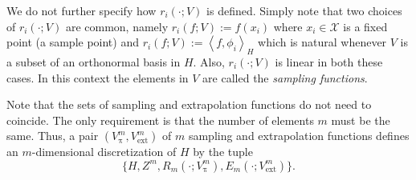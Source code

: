 \documentclass[a4paper]{paper}
\newcommand{\VecSpace}[1]{\mathscr{#1}}
\DeclareMathOperator{\rest}{\pi}
\newcommand{\ip}[2]{\left \langle #1,#2 \right\rangle}
\newcommand{\ext}{\text{ext}}
\begin{document}
We do not further specify how $r_{i}(\cdot;V)$ is defined.
    Simply note that two choices of $r_{i}(\cdot;V)$ are common, namely
    $r_{i}(f;V):=f(x_{i})$ where $x_{i}\in \VecSpace{X}$ is a fixed point (a sample 
    point) and $r_{i}(f;V):=\ip{f}{\phi_{i}}_{H}$ which is natural whenever
    $V$ is a subset of an orthonormal basis in $H$. Also, 
    $r_{i}(\cdot;V)$ is linear in both these cases.
    In this context the elements in $V$ are called the 
    \emph{sampling functions}.

Note that the sets of sampling and extrapolation functions do not 
need to coincide.  The only requirement is that the number of 
elements $m$ must be the same. Thus, a pair 
$(V^m_{\rest},V^m_{\ext})$ of $m$ 
sampling and extrapolation functions defines an $m$-dimensional 
discretization of $H$ by the tuple
\[ \bigl\{
     H,Z^m,R_{m}(\cdot;V^m_{\rest}),E_{m}(\cdot;V^m_{\ext})
   \bigr\}. \]
   
\end{document}
